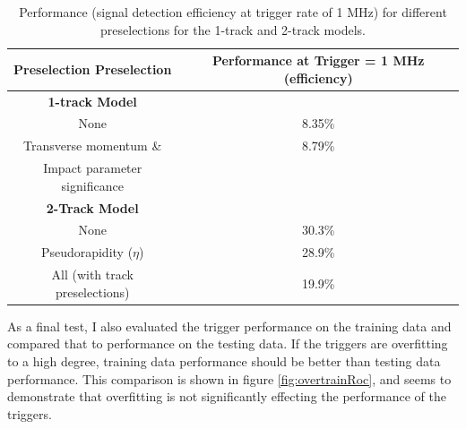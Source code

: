 \documentclass[12pt, letterpaper]{article}
\begin{document}
\begin{center}
\begin{table}
\begin{tabular}{ c|c } 

 Preselection Preselection & Performance at Trigger = 1 MHz (efficiency) \\ 
 \hline
 \textbf{1-track Model} &   \\ 
 None &  8.35\%\\
 Transverse momentum \& & 8.79\% \\
 Impact parameter significance &  \\ 
 \hline
 \textbf{2-Track Model} & \\
None & 30.3\%\\
 Pseudorapidity ($\eta$) & 28.9\%\\
 All (with track preselections) &  19.9\% \\
 
 
\end{tabular}
\caption{Performance (signal detection efficiency at trigger rate of 1 MHz) for different preselections for the 1-track and 2-track models.}
\label{table:preselectPerf}
\end{table}
\end{center}

As a final test, I also evaluated the trigger performance on the training data and compared that to performance on the testing data. If the triggers are overfitting to a high degree, training data performance should be better than testing data performance. This comparison is shown in figure \ref{fig:overtrainRoc}, and seems to demonstrate that overfitting is not significantly effecting the performance of the triggers.
\end{document}
